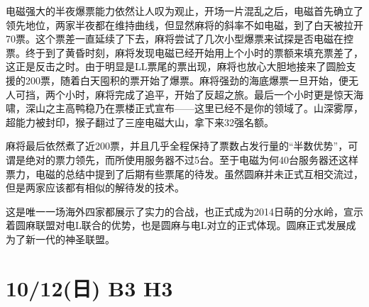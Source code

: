 电磁强大的半夜爆票能力依然让人叹为观止，开场一片混乱之后，电磁首先确立了领先地位，两家半夜都在维持曲线，但显然麻将的斜率不如电磁，到了白天被拉开70票。这个票差一直延续了下去，麻将尝试了几次小型爆票来试探是否电磁在控票。终于到了黄昏时刻，麻将发现电磁已经开始用上个小时的票额来填充票差了，这正是反击之时。由于明显是LL票尾的票出现，麻将也放心大胆地接来了圆脸支援的200票，随着白天囤积的票开始了爆票。麻将强劲的海底爆票一旦开始，便无人可挡，两个小时，麻将完成了追平，开始了反超之旅。最后一个小时更是惊天海啸，深山之主高鸭稳乃在票楼正式宣布——这里已经不是你的领域了。山深雾厚，超能力被封印，猴子翻过了三座电磁大山，拿下来32强名额。

麻将最后依然煮了近200票，并且几乎全程保持了票数占发行量的“半数优势”，可谓是绝对的票力领先，而所使用服务器不过5台。至于电磁为何40台服务器还这样票力，电磁的总结中提到了后期有些票尾的待发。虽然圆麻并未正式互相交流过，但是两家应该都有相似的解待发的技术。

这是唯一一场海外四家都展示了实力的合战，也正式成为2014日萌的分水岭，宣示着圆麻联盟对电L联合的优势，也是圆麻与电L对立的正式体现。圆麻正式发展成为了新一代的神圣联盟。

\section{10/12(日) B3 H3}


